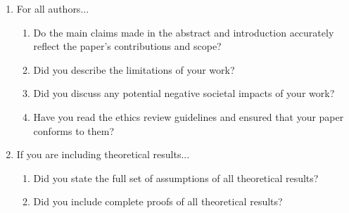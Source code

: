 \documentclass[]{article}
\theoremstyle{plain}
\theoremstyle{definition}
\theoremstyle{remark}
\begin{document}
\begin{enumerate}
\item For all authors...
\begin{enumerate}
  \item Do the main claims made in the abstract and introduction accurately reflect the paper's contributions and scope?
    \answerYes{}
  \item Did you describe the limitations of your work? 
  \item Did you discuss any potential negative societal impacts of your work?
  \item Have you read the ethics review guidelines and ensured that your paper conforms to them?
    \answerYes{}
\end{enumerate}


\item If you are including theoretical results...
\begin{enumerate}
  \item Did you state the full set of assumptions of all theoretical results?
    \answerNA{}
        \item Did you include complete proofs of all theoretical results?
    \answerNA{}
\end{enumerate}



\end{enumerate}
\end{document}
